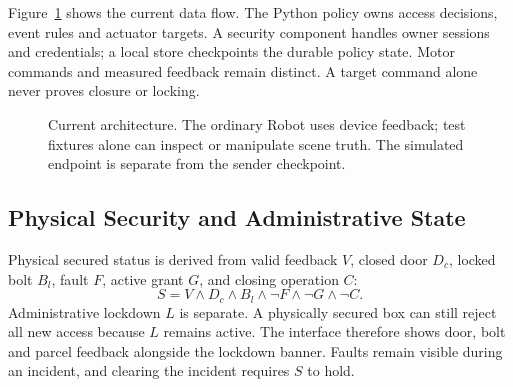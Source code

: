\documentclass[conference,letterpaper]{IEEEtran}
\begin{document}
Figure~\ref{fig:architecture} shows the current data flow. The Python policy owns access decisions, event rules and actuator targets. A security component handles owner sessions and credentials; a local store checkpoints the durable policy state. Motor commands and measured feedback remain distinct. A target command alone never proves closure or locking.
\begin{figure}[t]\centering
{}
\caption{Current architecture. The ordinary Robot uses device feedback; test fixtures alone can inspect or manipulate scene truth. The simulated endpoint is separate from the sender checkpoint.}\label{fig:architecture}
\end{figure}

\subsection{Physical Security and Administrative State}
Physical secured status is derived from valid feedback $V$, closed door $D_c$, locked bolt $B_l$, fault $F$, active grant $G$, and closing operation $C$:
\begin{equation}S=V\land D_c\land B_l\land\neg F\land\neg G\land\neg C.\end{equation}
Administrative lockdown $L$ is separate. A physically secured box can still reject all new access because $L$ remains active. The interface therefore shows door, bolt and parcel feedback alongside the lockdown banner. Faults remain visible during an incident, and clearing the incident requires $S$ to hold.
\end{document}
